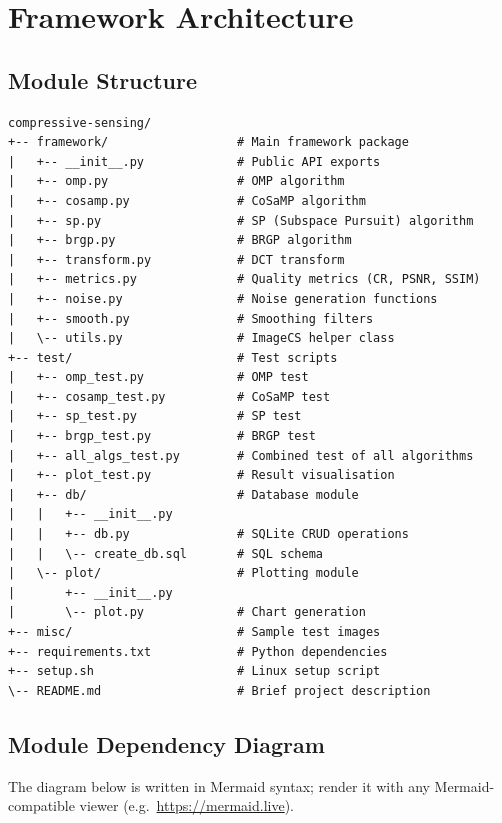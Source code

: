 \documentclass[12pt,a4paper]{article}
\begin{document}
\section{Framework Architecture}

\subsection{Module Structure}

\begin{lstlisting}
compressive-sensing/
+-- framework/                  # Main framework package
|   +-- __init__.py             # Public API exports
|   +-- omp.py                  # OMP algorithm
|   +-- cosamp.py               # CoSaMP algorithm
|   +-- sp.py                   # SP (Subspace Pursuit) algorithm
|   +-- brgp.py                 # BRGP algorithm
|   +-- transform.py            # DCT transform
|   +-- metrics.py              # Quality metrics (CR, PSNR, SSIM)
|   +-- noise.py                # Noise generation functions
|   +-- smooth.py               # Smoothing filters
|   \-- utils.py                # ImageCS helper class
+-- test/                       # Test scripts
|   +-- omp_test.py             # OMP test
|   +-- cosamp_test.py          # CoSaMP test
|   +-- sp_test.py              # SP test
|   +-- brgp_test.py            # BRGP test
|   +-- all_algs_test.py        # Combined test of all algorithms
|   +-- plot_test.py            # Result visualisation
|   +-- db/                     # Database module
|   |   +-- __init__.py
|   |   +-- db.py               # SQLite CRUD operations
|   |   \-- create_db.sql       # SQL schema
|   \-- plot/                   # Plotting module
|       +-- __init__.py
|       \-- plot.py             # Chart generation
+-- misc/                       # Sample test images
+-- requirements.txt            # Python dependencies
+-- setup.sh                    # Linux setup script
\-- README.md                   # Brief project description
\end{lstlisting}

\subsection{Module Dependency Diagram}

The diagram below is written in Mermaid syntax; render it with any
Mermaid-compatible viewer (e.g.\ \url{https://mermaid.live}).
\end{document}
